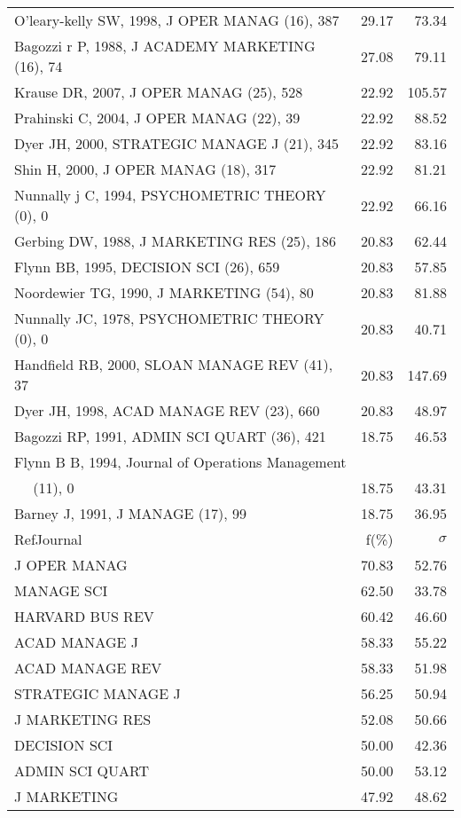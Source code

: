 \documentclass[a4paper,11pt]{report}
\begin{document}
\begin{landscape}
\begin{table}[!ht]
{\begin{tabular}{|l r r|}
O'leary-kelly SW, 1998, J OPER MANAG (16), 387 & 29.17 & 73.34\\
Bagozzi r P, 1988, J ACADEMY MARKETING (16), 74 & 27.08 & 79.11\\
Krause DR, 2007, J OPER MANAG (25), 528 & 22.92 & 105.57\\
Prahinski C, 2004, J OPER MANAG (22), 39 & 22.92 & 88.52\\
Dyer JH, 2000, STRATEGIC MANAGE J (21), 345 & 22.92 & 83.16\\
Shin H, 2000, J OPER MANAG (18), 317 & 22.92 & 81.21\\
Nunnally j C, 1994, PSYCHOMETRIC THEORY (0), 0 & 22.92 & 66.16\\
Gerbing DW, 1988, J MARKETING RES (25), 186 & 20.83 & 62.44\\
Flynn BB, 1995, DECISION SCI (26), 659 & 20.83 & 57.85\\
Noordewier TG, 1990, J MARKETING (54), 80 & 20.83 & 81.88\\
Nunnally JC, 1978, PSYCHOMETRIC THEORY (0), 0 & 20.83 & 40.71\\
Handfield RB, 2000, SLOAN MANAGE REV (41), 37 & 20.83 & 147.69\\
Dyer JH, 1998, ACAD MANAGE REV (23), 660 & 20.83 & 48.97\\
Bagozzi RP, 1991, ADMIN SCI QUART (36), 421 & 18.75 & 46.53\\
Flynn B B, 1994, Journal of Operations Management &  & \\
$\quad$ (11), 0 & 18.75 & 43.31\\
Barney J, 1991, J MANAGE (17), 99 & 18.75 & 36.95\\
\hline
\hline
RefJournal & f(\%) & $\sigma$\\
\hline
J OPER MANAG & 70.83 & 52.76\\
MANAGE SCI & 62.50 & 33.78\\
HARVARD BUS REV & 60.42 & 46.60\\
ACAD MANAGE J & 58.33 & 55.22\\
ACAD MANAGE REV & 58.33 & 51.98\\
STRATEGIC MANAGE J & 56.25 & 50.94\\
J MARKETING RES & 52.08 & 50.66\\
DECISION SCI & 50.00 & 42.36\\
ADMIN SCI QUART & 50.00 & 53.12\\
J MARKETING & 47.92 & 48.62\\
\hline
\end{tabular}
}
\end{table}

\end{landscape}
\end{document}
